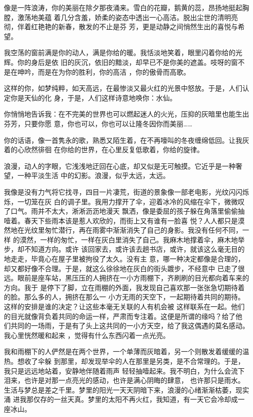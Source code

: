 \documentclass[12pt,a4paper]{article}
\begin{document}
		像是一阵浪涛，你的美丽在除夕那夜涌来。雪白的花瓣，鹅黄的蕊，昂扬地挺起胸膛，激荡地美蕴
	着几分含羞，娇柔的姿态中透出一心高洁。脱出尘世的清明亮彻，伴着红艳艳的新春，散发的不止是芬
	芳，更是动静之间悄然生出的喜悦与希望。

		我空荡的窗前满是你的动人，满是你给的暖。我恬淡地笑着，眼里闪着你给的光辉。你的身后是依
	旧的灰沉，依旧的黯淡，却早已不是你美的遮盖。吱呀的窗不是在呻吟，而是在为你的胜利，你的高洁
	，你的傲骨而高歌。

		这样的你，如梦纯粹，如天高远，在最惨淡又最火红的光景中怒放。于是，人们认定你是天仙的化
	身，于是，人们这样诗意地唤你：水仙。

		你悄悄地告诉我：在不完美的世界也可以燃起迷人的火光，压抑的灰暗里也能生出芬芳，只要你愿
	意，你也可以，你也可以让隆冬因你而美丽……

		你的话语，像一首隽永的歌，熟悉又陌生着，在不再嚎叫的冬夜缠绵低回。让我灰着的心欣然徘徊
	在你给的世界，在心里反复低歌着，你给的旋律。

	\endwriting



		浪漫，动人的字眼，它浅浅地迂回在心底，却又似是无可触摸。它近乎是一种奢望，一种平淡生活
	中的幻影。浪漫，似乎太远，太远。

		我像是没有力气将它找寻，四目一片凄荒，街道的景象像一部老电影，光纹闪闪烁烁，一切笼在灰
	白的调子里。我用力撑开了伞，迎着冰冷的风缩在伞下，微微叹了口气。雨并不太大，淅淅沥沥地漫天
	飘洒，像是委屈的孩子躲在角落里偷偷抽噎着。春天下些雨本该是惹人欢欣的，而街上又有谁有一脸喜
	悦？人人都只是漠然地在光纹里匆忙潜行，再在雨雾中渐渐消失了自己的身影。我没有任何不同，一样
	的漠然，一样的匆忙，一样在灰白里消失了自己。我麻木地撑着伞，麻木地举步，却不知道方向。或许
	该回家去，或许该去趟书店，或许，就该这么毫无目的地走走，毕竟心在屋子里被拘役了太久。没有主
	意，哪一种决定都像是合理的，却又都好像不合理。于是，就这么徐徐地在灰白的街头踱步，不经意中
	已走了很远。眼前是座车站，黑压压的人拥挤在一小方雨棚下，齐刷刷的目光都向着车来的方向。我于
	是停下了脚，立在雨棚的外面，我发现自己喜欢那一张张急切期待着的脸。那么多的人，拥挤在那么一
	小方无雨的天空下，一起期待着共同的期待。这样的安排是谁的决定？让这些本毫无关联的人有机会被
	这样联系在一起。他们的目光就像背负着共同的命运一样，严肃而专注着。这便是所谓的缘吗？给了他
	们共同的一场雨，于是有了头上这共同的一小方天空，给了我这偶遇的莫名感动。我心里恍然暖和起来
	，觉得有什么东西闪着一点光亮。

		我和雨棚下的人俨然是在两个世界，一个单薄而灰暗着，另一个则散发着缓缓的温热。想收了伞躲
	到那里，却发现举伞的人在那里是另类，是不合常理的。于是，我只是远远地站着，安静地伴随着雨声
	轻轻抽噎起来。我不明白，为什么会流下泪来，也许是对那一点亮光的感动，也许是满心阴晦的肆意，
	也许那只是雨水。生活与梦总是差之千里。梦里的阳光一天天阴暗下来，浪漫的心绪渐渐枯萎，现实涌
	进我那仅存的一丝天真。梦里的太阳不再火红，我知道，有一天它会冷却成一座冰山。
\end{document}
